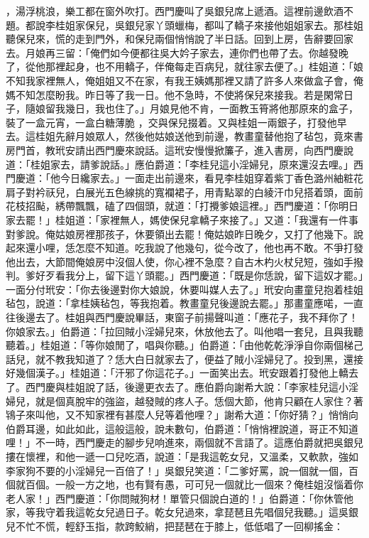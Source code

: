 ，湯浮桃浪，樂工都在窗外吹打。西門慶叫了吳銀兒席上遞酒。這裡前邊飲酒不題。都說李桂姐家保兒，吳銀兒家丫頭蠟梅，都叫了轎子來接他姐姐家去。那桂姐聽保兒來，慌的走到門外，和保兒兩個悄悄說了半日話。回到上房，告辭要回家去。月娘再三留：「俺們如今便都往吳大妗子家去，連你們也帶了去。你越發晚了，從他那裡起身，也不用轎子，伴俺每走百病兒，就往家去便了。」桂姐道：「娘不知我家裡無人，俺姐姐又不在家，有我王姨媽那裡又請了許多人來做盒子會，俺媽不知怎麼盼我。昨日等了我一日。他不急時，不使將保兒來接我。若是閑常日子，隨娘留我幾日，我也住了。」月娘見他不肯，一面教玉筲將他那原來的盒子，裝了一盒元宵，一盒白糖薄脆 ，交與保兒掇着。又與桂姐一兩銀子，打發他早去。這桂姐先辭月娘眾人，然後他姑娘送他到前邊，教畫童替他抱了毡包，竟來書房門首，教玳安請出西門慶來說話。這玳安慢慢掀簾子，進入書房，向西門慶說道：「桂姐家去，請爹說話。」應伯爵道：「李桂兒這小淫婦兒，原來還沒去哩。」西門慶道：「他今日纔家去。」一面走出前邊來，看見李桂姐穿着紫丁香色潞州紬粧花肩子對衿祆兒，白展光五色線挑的寬襴裙子，用青點翠的白綾汗巾兒搭着頭，面前花枝招颭，綉帶飄飄，磕了四個頭，就道：「打攪爹娘這裡。」西門慶道：「你明日家去罷！」桂姐道：「家裡無人，媽使保兒拿轎子來接了。」又道：「我還有一件事對爹說。俺姑娘房裡那孩子，休要領出去罷！俺姑娘昨日晚夕，又打了他幾下。說起來還小哩，恁怎麼不知道。吃我說了他幾句，從今改了，他也再不敢。不爭打發他出去，大節間俺娘房中沒個人使，你心裡不急麼？自古木杓火杖兒短，強如手撥判。爹好歹看我分上，留下這丫頭罷。」西門慶道：「既是你恁說，留下這奴才罷。」一面分付玳安：「你去後邊對你大娘說，休要叫媒人去了。」玳安向畫童兒抱着桂姐毡包，說道：「拿桂姨毡包，等我抱着。教畫童兒後邊說去罷。」那畫童應喏，一直往後邊去了。桂姐與西門慶說畢話，東窗子前揚聲叫道：「應花子，我不拜你了！你娘家去。」伯爵道：「拉回賊小淫婦兒來，休放他去了。叫他唱一套兒，且與我聽聽着。」桂姐道：「等你娘閒了，唱與你聽。」伯爵道：「由他乾乾淨淨自你兩個梯己話兒，就不教我知道了？恁大白日就家去了，便益了賊小淫婦兒了。投到黑，還接好幾個漢子。」桂姐道：「汗邪了你這花子。」一面笑出去。玳安跟着打發他上轎去了。西門慶與桂姐說了話，後邊更衣去了。應伯爵向謝希大說：「李家桂兒這小淫婦兒，就是個真脫牢的強盜，越發賊的疼人子。恁個大節，他肯只顧在人家住？著鴇子來叫他，又不知家裡有甚麼人兒等着他哩？」謝希大道：「你好猜？」悄悄向伯爵耳邊，如此如此，這般這般，說未數句，伯爵道：「悄悄裡說道，哥正不知道哩！」不一時，西門慶走的腳步兒响進來，兩個就不言語了。這應伯爵就把吳銀兒摟在懷裡，和他一遞一口兒吃酒，說道：「是我這乾女兒，又溫柔，又軟款，強如李家狗不要的小淫婦兒一百倍了！」吳銀兒笑道：「二爹好罵，說一個就一個，百個就百個。一般一方之地，也有賢有愚，可可兒一個就比一個來？俺桂姐沒惱着你老人家！」西門慶道：「你問賊狗材！單管只個說白道的！」伯爵道：「你休管他家，等我守着我這乾女兒過日子。乾女兒過來，拿琵琶且先唱個兒我聽。」這吳銀兒不忙不慌，輕舒玉指，款跨鮫綃，把琵琶在于膝上，低低唱了一回柳搖金：


